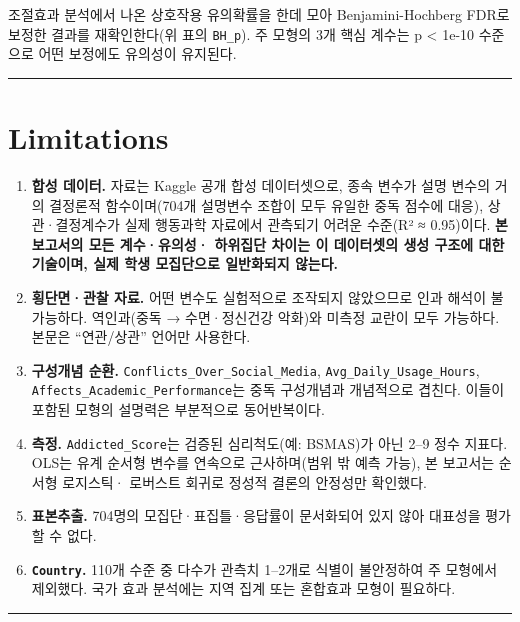 \documentclass[11pt]{article}
\providecommand{\tightlist}{%
      \setlength{\itemsep}{0pt}\setlength{\parskip}{0pt}}
\begin{document}
조절효과 분석에서 나온 상호작용 유의확률을 한데 모아 Benjamini-Hochberg
FDR로 보정한 결과를 재확인한다(위 표의 \texttt{BH\_p}). 주 모형의 3개
핵심 계수는 p \textless{} 1e-10 수준으로 어떤 보정에도 유의성이
유지된다.

    \begin{center}\rule{0.5\linewidth}{0.5pt}\end{center}

\hypertarget{limitations}{%
\section{Limitations}\label{limitations}}

\begin{enumerate}
\def\labelenumi{\arabic{enumi}.}
\tightlist
\item
  \textbf{합성 데이터.} 자료는 Kaggle 공개 합성 데이터셋으로, 종속
  변수가 설명 변수의 거의 결정론적 함수이며(704개 설명변수 조합이 모두
  유일한 중독 점수에 대응), 상관·결정계수가 실제 행동과학 자료에서
  관측되기 어려운 수준(R² ≈ 0.95)이다. \textbf{본 보고서의 모든
  계수·유의성· 하위집단 차이는 이 데이터셋의 생성 구조에 대한 기술이며,
  실제 학생 모집단으로 일반화되지 않는다.}
\item
  \textbf{횡단면·관찰 자료.} 어떤 변수도 실험적으로 조작되지 않았으므로
  인과 해석이 불가능하다. 역인과(중독 → 수면·정신건강 악화)와 미측정
  교란이 모두 가능하다. 본문은 ``연관/상관'' 언어만 사용한다.
\item
  \textbf{구성개념 순환.} \texttt{Conflicts\_Over\_Social\_Media},
  \texttt{Avg\_Daily\_Usage\_Hours},
  \texttt{Affects\_Academic\_Performance}는 중독 구성개념과 개념적으로
  겹친다. 이들이 포함된 모형의 설명력은 부분적으로 동어반복이다.
\item
  \textbf{측정.} \texttt{Addicted\_Score}는 검증된 심리척도(예: BSMAS)가
  아닌 2--9 정수 지표다. OLS는 유계 순서형 변수를 연속으로 근사하며(범위
  밖 예측 가능), 본 보고서는 순서형 로지스틱· 로버스트 회귀로 정성적
  결론의 안정성만 확인했다.
\item
  \textbf{표본추출.} 704명의 모집단·표집틀·응답률이 문서화되어 있지 않아
  대표성을 평가할 수 없다.
\item
  \textbf{\texttt{Country}.} 110개 수준 중 다수가 관측치 1--2개로 식별이
  불안정하여 주 모형에서 제외했다. 국가 효과 분석에는 지역 집계 또는
  혼합효과 모형이 필요하다.
\end{enumerate}

    \begin{center}\rule{0.5\linewidth}{0.5pt}\end{center}
\end{document}
